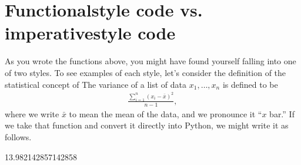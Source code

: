 \documentclass[letterpaper,10pt,english]{sphinxmanual}
\begin{document}
\section{Functional\sphinxhyphen{}style code vs. imperative\sphinxhyphen{}style code}
\label{\detokenize{chapter-4-review-of-python-and-pandas:functional-style-code-vs-imperative-style-code}}
As you wrote the functions above, you might have found yourself falling into one of two styles.  To see examples of each style, let’s consider the definition of the statistical concept of   The variance of a list of data \(x_1,\ldots,x_n\) is defined to be
\begin{equation*}
\begin{split}\frac{\sum_{i=1}^{n} (x_i-\bar{x})^2}{n-1},\end{split}
\end{equation*}
where we write \(\bar{x}\) to mean the mean of the data, and we pronounce it “\(x\) bar.”  If we take that function and convert it directly into Python, we might write it as follows.

\begin{sphinxVerbatim}[commandchars=\\\{\}]
   

    
      \PYG{p}{[}          \PYG{p}{]}       

  \PYG{p}{[}         \PYG{p}{]}
  
\end{sphinxVerbatim}

\begin{sphinxVerbatim}[commandchars=\\\{\}]
13.982142857142858
\end{sphinxVerbatim}
\end{document}

